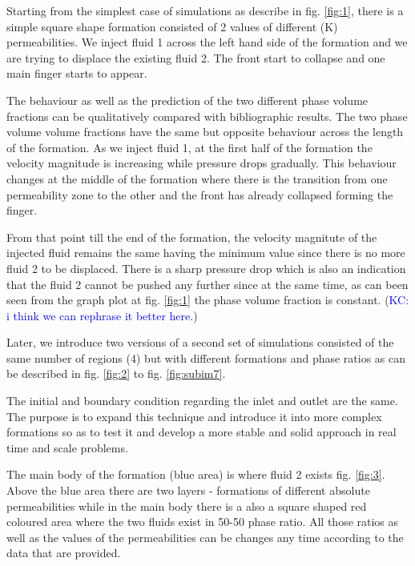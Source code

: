 \documentclass[preprint,authoryear,12pt]{elsarticle}
\begin{document}
Starting from the simplest case of simulations as describe in fig. \ref{fig:1}, there is a simple square shape formation consisted of 2 values of different (K) permeabilities. We inject fluid 1 across the left hand side of the formation and we are trying to displace the existing fluid 2. The front start to collapse and one main finger starts to appear.

The behaviour as well as the prediction of the two different phase volume fractions can be qualitatively compared with bibliographic results. The two phase volume volume fractions have the same but opposite behaviour across the length of the formation. As we inject fluid 1, at the first half of the formation the velocity magnitude is increasing while pressure drops gradually. This behaviour changes at the middle of the formation where there is the transition from one permeability zone to the other and the front has already collapsed forming the finger. 

From that point till the end of the formation, the velocity magnitute of the injected fluid remains the same having the minimum value since there is no more fluid 2 to be displaced. There is a sharp pressure drop which is also an indication that the fluid 2 cannot be pushed any further since at the same time, as can been seen from the graph plot at fig. \ref{fig:1} the phase volume fraction is constant. (\textcolor{blue}{KC: i think we can rephrase it better here.}) 

Later, we introduce two versions of a second set of simulations consisted of the same number of regions (4) but with different formations and phase ratios as can be described in fig. \ref{fig:2} to fig. \ref{fig:subim7}. 

The initial and boundary condition regarding the inlet and outlet are the same. The purpose is to expand this technique and introduce it into more complex formations so as to test it and develop a more stable and solid approach in real time and scale problems. 

The main body of the formation (blue area) is where fluid 2 exists fig. \ref{fig:3}. Above the blue area there are two layers - formations of different absolute permeabilities while in the main body there is a also a square shaped red coloured area where the two fluids exist in 50-50 phase ratio. All those ratios as well as the values of the permeabilities can be changes any time according to the data that are provided.
\end{document}
